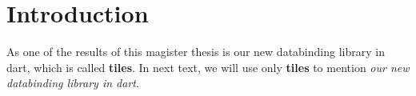 \chapter*{Introduction}\label{chap:intro}

As one of the results of this magister thesis is our new databinding library in dart, 
which is called \textbf{tiles}. 
In next  text, we will use only \textbf{tiles} to mention \textit{our new databinding library in dart}.

